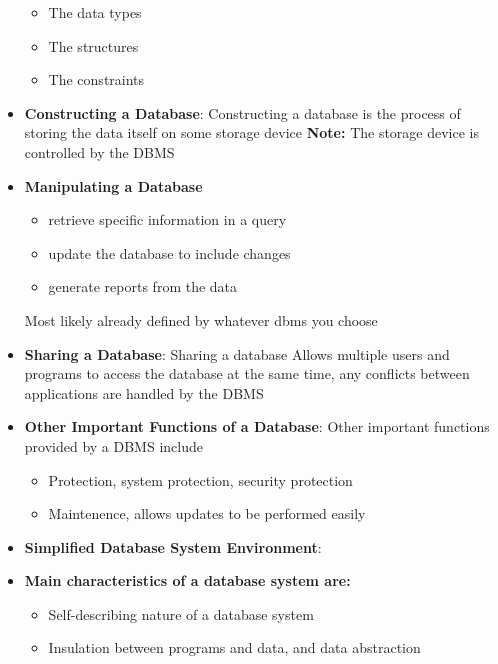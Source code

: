 \documentclass{report}
\begin{document}
\begin{itemize}
            \begin{itemize}
                \item The data types
                \item The structures
                \item The constraints
            \end{itemize}
        \item \textbf{Constructing a Database}: Constructing a database is the process of storing the data itself on some storage device
            \bigbreak \noindent 
            \textbf{Note:} The storage device is controlled by the DBMS
        \item \textbf{Manipulating a Database}
            \begin{itemize}
                \item retrieve specific information in a query
                \item update the database to include changes
                \item generate reports from the data
            \end{itemize}
            \bigbreak \noindent 
            Most likely already defined by whatever dbms you choose
        \item \textbf{Sharing a Database}: Sharing a database Allows multiple users and programs to access the database at the same time, any conflicts between applications are handled by the DBMS
        \item \textbf{Other Important Functions of a Database}: Other important functions provided by a DBMS include
            \begin{itemize}
                \item Protection, system protection, security protection
                \item Maintenence, allows updates to be performed easily
            \end{itemize}
        \item \textbf{Simplified Database System Environment}:
            \bigbreak \noindent 
        \item \textbf{Main characteristics of a database system are:}
            \begin{itemize}
                \item Self-describing nature of a database system
                \item Insulation between programs and data, and data abstraction

\end{itemize}
\end{itemize}
\end{document}
